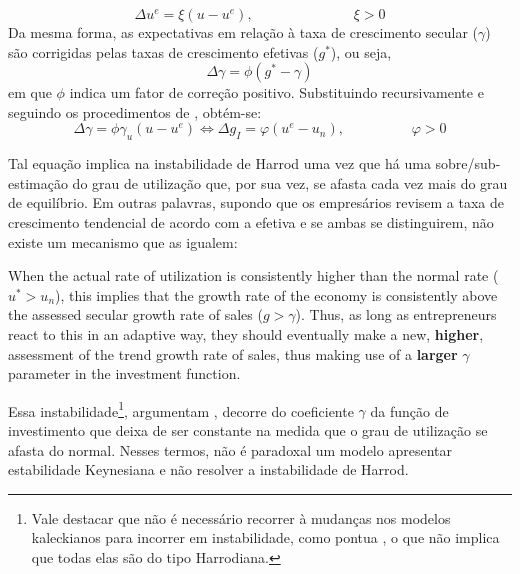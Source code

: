 \begin{equation}
\Delta u^e = \xi (u - u^e), \hspace{3cm} \xi > 0
\end{equation}
Da mesma forma, as expectativas em relação à taxa de crescimento secular ($\gamma$) são corrigidas pelas taxas de crescimento efetivas ($g^*$), ou seja, 
\begin{equation}
\label{Autonomo_gamma}
    \Delta \gamma = \phi (g^* - \gamma)
\end{equation}
em que $\phi$ indica um fator de correção positivo. Substituindo recursivamente e seguindo os procedimentos de \textcite[p.~5]{allain_macroeconomic_2014}, obtém-se:
\begin{equation}
\label{Autonomo_u}
    \Delta \gamma = \phi \gamma_u (u - u^e) \Leftrightarrow \Delta g_I = \varphi (u^e - u_n), \hspace{2cm} \varphi > 0
\end{equation}

Tal equação implica na instabilidade de Harrod uma vez que há uma sobre/sub-estimação do grau de utilização que, por sua vez, se afasta cada vez mais do grau de equilíbrio. Em outras palavras, supondo que os empresários revisem a taxa de crescimento tendencial de acordo com a efetiva e se ambas se distinguirem, não existe um mecanismo que as igualem:
\begin{citation}
When the actual rate of utilization is consistently higher than the normal rate ($u^* > u_n$), this implies that the growth rate of the economy is consistently above the assessed secular growth rate of sales ($g > \gamma$). Thus, as long as entrepreneurs react to this in an adaptive way, they should eventually make a new, \textbf{higher}, assessment of the trend growth rate of
sales, thus making use of a \textbf{larger} $\gamma$ parameter in the investment function.
\cite[p.~144, grifos adicionados e variáveis adaptadas]{hein_harrodian_2012}
\end{citation}
Essa instabilidade\footnote{Vale destacar que não é necessário recorrer à mudanças nos modelos kaleckianos para incorrer em instabilidade, como pontua \textcite{dallery_kaleckian_2007}, o que não implica que todas elas são do tipo Harrodiana.}, argumentam \textcite[p.~144]{hein_harrodian_2012}, decorre do coeficiente $\gamma$ da função de investimento que deixa de ser constante na medida que o grau de utilização se afasta do normal. Nesses termos, não é paradoxal um modelo apresentar estabilidade Keynesiana e não resolver a instabilidade de Harrod. 

